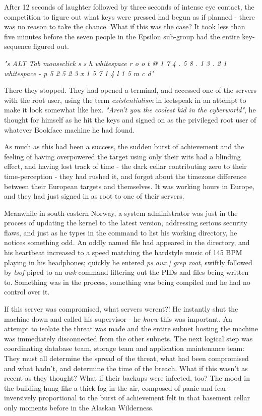 After 12 seconds of laughter followed by three seconds of intense eye contact, the competition to figure out what keys were pressed had begun as if planned - there was no reason to take the chance. What if this was the case? It took less than five minutes before the seven people in the Epsilon sub-group had the entire key-sequence figured out.

\textit{"s ALT Tab mouseclick s s h whitespace r o o t @ 1 7 4 . 5 8 . 1 3 . 2 1 whitespace - p 5 2 5 2 3 x 1 5 7 1 4 l 1 5 m c d"}

There they stopped. They had opened a terminal, and accessed one of the servers with the root user, using the term \textit{existentialism} in leetspeak in an attempt to make it look somewhat like hex. \textit{"Aren't you the coolest kid in the cyberworld"}, he thought for himself as he hit the keys and signed on as the privileged root user of whatever Bookface machine he had found.   

As much as this had been a success, the sudden burst of achievement and the feeling of having overpowered the target using only their wits had a blinding effect, and having lost track of time - the dark cellar contributing zero to their time-perception - they had rushed it, and forgot about the timezone difference between their European targets and themselves. It was working hours in Europe, and they had just signed in as root to one of their servers.

Meanwhile in south-eastern Norway, a system administrator was just in the process of updating the kernel to the latest version, addressing serious security flaws, and just as he types in the command to list his working directory, he notices something odd. An oddly named file had appeared in the directory, and his heartbeat increased to a speed matching the hardstyle music of 145 BPM playing in his headphones; quickly he entered \textit{ps aux | grep root}, swiftly followed by \textit{lsof} piped to an \textit{awk} command filtering out the PIDs and files being written to. Something was in the process, something was being compiled and he had no control over it. 

If this server was compromised, what servers werent?! He instantly shut the machine down and called his supervisor - he \textit{knew} this was important. An attempt to isolate the threat was made and the entire subnet hosting the machine was immediately disconnected from the other subnets. The next logical step was coordinating database team, storage team and application maintenance team: They must all determine the spread of the threat, what had been compromised and what hadn't, and determine the time of the breach. What if this wasn't as recent as they thought? What if their backups were infected, too? The mood in the building hung like a thick fog in the air, composed of panic and fear inversively proportional to the burst of achievement felt in that basement cellar only moments before in the Alaskan Wilderness. 


